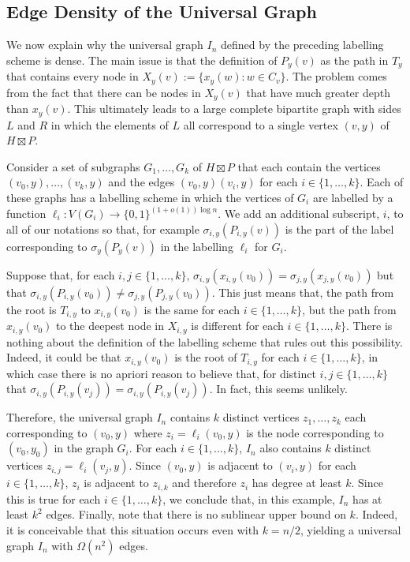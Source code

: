 \documentclass{patmorin}
\begin{document}
\subsection{Edge Density of the Universal Graph}
\label{density-lower-bound}

We now explain why the universal graph $I_n$ defined by the preceding labelling scheme is dense.  The main issue is that the definition of $P_y(v)$ as the path in $T_y$ that contains every node in $X_y(v):=\{x_y(w):w\in C_v\}$.  The problem comes from the fact that there can be nodes in $X_y(v)$ that have much greater depth than $x_y(v)$.  This ultimately leads to a large complete bipartite graph with sides $L$ and $R$ in which the elements of $L$ all correspond to a single vertex $(v,y)$ of $H\boxtimes P$.

Consider a set of subgraphs $G_1,\ldots,G_k$ of $H\boxtimes P$ that each contain the vertices $(v_0,y),\ldots,(v_k,y)$ and the edges $(v_0,y)(v_i,y)$ for each $i\in\{1,\ldots,k\}$.  Each of these graphs has a labelling scheme in which the vertices of $G_i$ are labelled by a function $\ell_i:V(G_i)\to\{0,1\}^{(1+o(1))\log n}$.  We add an additional subscript, $i$, to all of our notations so that, for example $\sigma_{i,y}(P_{i,y}(v))$ is the part of the label corresponding to $\sigma_y(P_y(v))$ in the labelling $\ell_i$ for $G_i$.

Suppose that, for each $i,j\in\{1,\ldots,k\}$, $\sigma_{i,y}(x_{i,y}(v_0))=\sigma_{j,y}(x_{j,y}(v_0))$ but that $\sigma_{i,y}(P_{i,y}(v_0))\neq\sigma_{j,y}(P_{j,y}(v_0))$.  This just means that, the path from the root is $T_{i,y}$ to $x_{i,y}(v_0)$ is the same for each $i\in\{1,\ldots,k\}$, but the path from $x_{i,y}(v_0)$ to the deepest node in $X_{i,y}$ is different for each $i\in\{1,\ldots,k\}$.  There is nothing about the definition of the labelling scheme that rules out this possibility.  Indeed, it could be that $x_{i,y}(v_0)$ is the root of $T_{i,y}$ for each $i\in\{1,\ldots,k\}$, in which case there is no apriori reason to believe that, for distinct $i,j\in\{1,\ldots,k\}$ that $\sigma_{i,y}(P_{i,y}(v_j))=\sigma_{i,y}(P_{i,y}(v_j))$.  In fact, this seems unlikely.

Therefore, the universal graph $I_n$ contains $k$ distinct vertices $z_1,\ldots,z_k$ each corresponding to $(v_0,y)$ where $z_i=\ell_i(v_0,y)$ is the node corresponding to $(v_0,y_0)$ in the graph $G_i$.  For each $i\in\{1,\ldots,k\}$, $I_n$ also contains $k$ distinct vertices $z_{i,j}=\ell_i(v_j,y)$.  Since $(v_0,y)$ is adjacent to $(v_i,y)$ for each $i\in\{1,\ldots,k\}$, $z_i$ is adjacent to $z_{i,k}$ and therefore $z_i$ has degree at least $k$. Since this is true for each $i\in\{1,\ldots,k\}$, we conclude that, in this example, $I_n$ has at least $k^2$ edges.  Finally, note that there is no sublinear upper bound on $k$. Indeed, it is conceivable that this situation occurs even with $k=n/2$, yielding a universal graph $I_n$ with $\Omega(n^2)$ edges.
\end{document}
